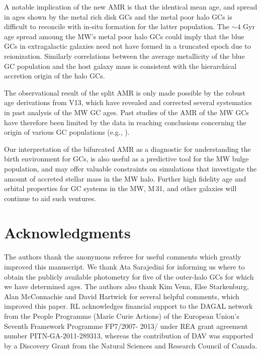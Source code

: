\documentclass[useAMS,usenatbib]{mn2e}
\begin{document}
A notable implication of the new AMR is that the
identical mean age, and spread in ages
shown by the metal rich disk GCs and the metal poor halo GCs is difficult
to reconcile with in-situ formation for the latter population.  The $\sim 4$ Gyr 
age spread amoung the MW's metal poor halo GCs could imply that the 
blue GCs in extragalactic galaxies need not have formed in a truncated epoch
due to reionization.  Similarly correlations between the average metallicity
of the blue GC population and the host galaxy mass is consistent with
the hierarchical accretion origin of the halo GCs.

The observational result of the split AMR is only made possible by the robust
age derivations from V13, which have revealed and corrected several systematics
in past analysis of the MW GC ages.  Past studies of the AMR of the MW GCs have
therefore been limited by the data in reaching conclusions concerning the
origin of various GC populations (e.g., \citealt{Forbes10}).

Our interpretation of the bifurcated AMR as a diagnostic for understanding the
birth environment for GCs, is also useful as a predictive tool for the MW bulge
population, and may offer valuable constraints on simulations that investigate
the amount of accreted stellar mass in the MW halo.  Further high fidelity age
and orbital properties for GC systems in the MW, M$\,$31, and other galaxies
will continue to aid such ventures.

\section*{Acknowledgments}
The authors thank the anonymous referee for useful comments which greatly
improved this manuscript.  
We thank Ata Sarajedini for informing us where to obtain the publicly available
photometry for five of the outer-halo GCs for which we have determined ages.
The authors also thank Kim Venn, Else Starkenburg, Alan McConnachie and
David Hartwick for several helpful comments, which improved this paper.  
RL acknowledges financial support to the DAGAL network from the
People Programme (Marie Curie Actions) of the European Union’s Seventh
Framework Programme FP7/2007- 2013/ under REA grant agreement number
PITN-GA-2011-289313, whereas the contribution of DAV was supported by a 
Discovery Grant from the Natural Sciences and Research Council of Canada.





\label{lastpage}
\end{document}
